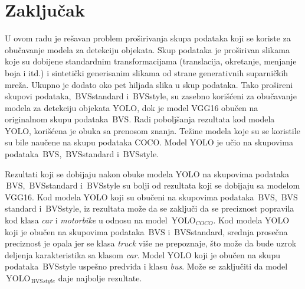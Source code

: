 \documentclass[12pt,oneside]{memoir}
\newcommand{\yolo}{\ensuremath{\,\textrm{YOLO}}}
\newcommand{\bvs}{\ensuremath{\,\textrm{BVS}}}
\begin{document}


\chapter{Zaključak}
\label{section6}
U ovom radu je rešavan problem proširivanja skupa podataka koji se koriste za obučavanje modela za detekciju objekata. Skup podataka je proširivan slikama koje su dobijene standardnim transformacijama (translacija, okretanje, menjanje boja i itd.) i sintetički generisanim slikama od strane generativnih suparničkih mreža. Ukupno je dodato oko pet hiljada slika u skup podataka. Tako prošireni skupovi podataka, \bvs{standard} i \bvs{style}, su zasebno korišćeni za obučavanje modela za detekciju objekata YOLO, dok je model VGG16 obučen na originalnom skupu podataka \bvs.
Radi poboljšanja rezultata kod modela YOLO, korišćena je obuka sa prenosom znanja.
Težine modela koje su se koristile su bile naučene na skupu podataka COCO. Model YOLO je učio na skupovima podataka \bvs, \bvs{standard} i \bvs{style}.


Rezultati koji se dobijaju nakon obuke modela YOLO na skupovima podataka \bvs, \bvs{standard} i \bvs{style} su bolji od rezultata koji se dobijaju sa modelom VGG16. Kod modela YOLO koji su obučeni na skupovima podataka \bvs, \bvs{standard} i \bvs{style}, iz rezultata može da se zaključi da se preciznost popravila kod klasa \textit{car} i \textit{motorbike} u odnosu na model $\yolo_{COCO}$. Kod modela YOLO koji je obučen na skupovima podataka \bvs{} i \bvs{standard}, srednja prosečna preciznost je opala jer se klasa \textit{truck} više ne prepoznaje, što može da bude uzrok deljenja karakteristika sa klasom \textit{car}. Model YOLO koji je obučen na skupu podataka \bvs{style} uspešno predviđa i klasu \textit{bus}. Može se zaključiti da model $\yolo_{\bvs{style}}$ daje najbolje rezultate.
\end{document}
